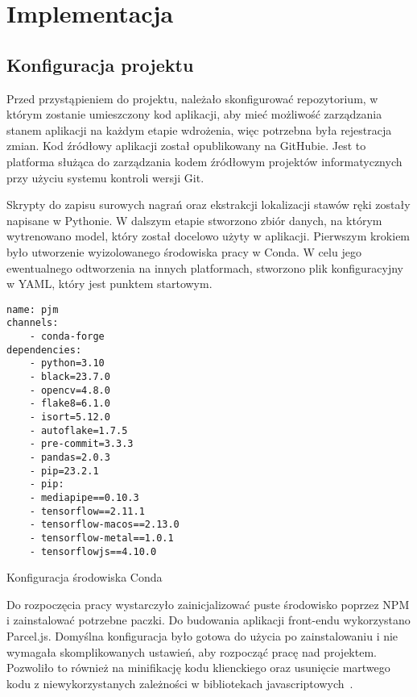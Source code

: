 \filbreak

\section{Implementacja}
\label{sec:implementation}

\subsection{Konfiguracja projektu}
\label{subsec:project-configuration}

Przed przystąpieniem do projektu, należało skonfigurować repozytorium, w którym zostanie umieszczony kod aplikacji, aby mieć możliwość zarządzania stanem aplikacji na każdym etapie wdrożenia, więc potrzebna była rejestracja zmian. Kod źródłowy aplikacji został opublikowany na GitHubie. Jest to platforma służąca do zarządzania kodem źródłowym projektów informatycznych przy użyciu systemu kontroli wersji Git.

Skrypty do zapisu surowych nagrań oraz ekstrakcji lokalizacji stawów ręki zostały napisane w Pythonie. W dalszym etapie stworzono zbiór danych, na którym wytrenowano model, który został docelowo użyty w aplikacji. Pierwszym krokiem było utworzenie wyizolowanego środowiska pracy w Conda. W celu jego ewentualnego odtworzenia na innych platformach, stworzono plik konfiguracyjny w YAML, który jest punktem startowym.

\begin{listing}[H]
    \color{white}
    \begin{verbatim}
name: pjm
channels:
    - conda-forge
dependencies:
    - python=3.10
    - black=23.7.0
    - opencv=4.8.0
    - flake8=6.1.0
    - isort=5.12.0
    - autoflake=1.7.5
    - pre-commit=3.3.3
    - pandas=2.0.3
    - pip=23.2.1
    - pip:
    - mediapipe==0.10.3
    - tensorflow==2.11.1
    - tensorflow-macos==2.13.0
    - tensorflow-metal==1.0.1
    - tensorflowjs==4.10.0
    \end{verbatim}
    \caption{Konfiguracja środowiska Conda}
    \label{lst:conda-environment-configuration}
\end{listing}

Do rozpoczęcia pracy wystarczyło zainicjalizować puste środowisko poprzez NPM i zainstalować potrzebne paczki. Do budowania aplikacji front-endu wykorzystano Parcel.js. Domyślna konfiguracja było gotowa do użycia po zainstalowaniu i nie wymagała skomplikowanych ustawień, aby rozpocząć pracę nad projektem. Pozwoliło to również na minifikację kodu klienckiego oraz usunięcie martwego kodu z niewykorzystanych zależności w bibliotekach javascriptowych~\cite{latendresse2022}.

